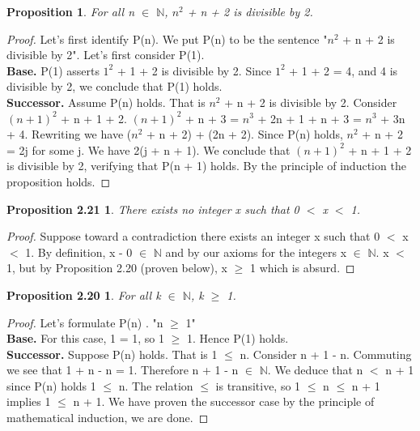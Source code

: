 \documentclass[12pt]{amsart}
\newcommand{\N}{\mathbb{N}}
\begin{document}
\newtheorem*{propExtra}{Proposition}
\begin{propExtra}
	For all n $\in$ $\N$, $n^2$ + n + 2 is divisible by 2.
\end{propExtra}

\begin{proof}
	Let's first identify P(n). We put P(n) to be the sentence "$n^2$ + n + 2 is divisible by 2". Let's first consider P(1).
	\\\textbf{Base.} P(1) asserts $1^2$ + 1 + 2 is divisible by 2. Since $1^2$ + 1 + 2 = 4, and 4 is divisible by 2, we conclude that P(1) holds.
	\\\textbf{Successor.} Assume P(n) holds. That is $n^2$ + n + 2 is divisible by 2. Consider $(n + 1)^2$ + n + 1 + 2. $(n + 1)^2$ + n + 3 = $n^3$ + 2n + 1 + n + 3 = $n^3$ + 3n + 4. Rewriting we have ($n^2$ + n + 2) + (2n + 2). Since P(n) holds, $n^2$ + n + 2 = 2j for some j. We have 2(j + n + 1). We conclude that $(n + 1)^2$ + n + 1 + 2 is divisible by 2, verifying that P(n + 1) holds. By the principle of induction the proposition holds.
\end{proof}


\newtheorem*{prop2.21}{Proposition 2.21}
\begin{prop2.21}
There exists no integer x such that 0 $<$ x $<$ 1.
\end{prop2.21}

\begin{proof}
	Suppose toward a contradiction there exists an integer x such that 0 $<$ x $<$ 1. By definition, x - 0  $\in$ $\N$ and by our axioms for the integers x $\in$ $\N$. x $<$ 1, but by Proposition 2.20 (proven below), x $\geq$ 1 which is absurd.
\end{proof}

\newtheorem*{prop2.20}{Proposition 2.20}
\begin{prop2.20}
	For all k $\in$ $\N$, k $\geq$ 1.
\end{prop2.20}

\begin{proof}
Let's formulate P(n) . "n $\geq$ 1"
\\\textbf{Base.} For this case, 1 = 1, so 1 $\geq$  1. Hence P(1) holds.
\\\textbf{Successor.} Suppose P(n) holds. That is 1 $\leq$ n. Consider n + 1 - n. Commuting we see that 1 + n - n = 1. Therefore n + 1 - n $\in$ $\N$. We deduce that n $<$ n + 1 since P(n) holds 1 $\leq$ n. The relation $\leq$ is transitive, so 1 $\leq$ n $\leq$ n + 1 implies 1 $\leq$ n + 1. We have proven the successor case by the principle of mathematical induction, we are done.
\end{proof}
\end{document}
